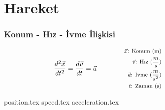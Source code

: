 \section{Hareket}

\subsubsection*{Konum - Hız - İvme İlişkisi}
\begin{equation}
    \frac{d^2 \vec{x}}{dt^2} = \frac{d\vec{v}}{dt} = \vec{a} \qquad \qquad \parbox{4cm}{\footnotesize$\begin{aligned}
        \vec{x}\text{: Konum (m)} \\
        \vec{v}\text{: Hız } (\frac{m}{s}) \\
        \vec{a}\text{: İvme } (\frac{m}{s^2}) \\    
        t\text{: Zaman (s)}
\end{aligned}$}
\end{equation}

{position.tex}
{speed.tex}
{acceleration.tex}